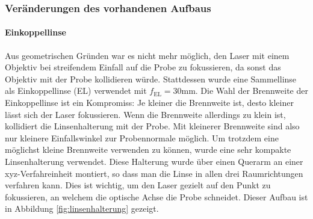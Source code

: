 \documentclass[titlepage,  ngerman]{article}
\begin{document}
	\subsubsection{Veränderungen des vorhandenen Aufbaus}
	\label{sec:OpticalChanges}
	\paragraph{Einkoppellinse}
	Aus geometrischen Gründen war es nicht mehr möglich, den Laser mit einem Objektiv bei streifendem Einfall auf die Probe zu fokussieren, da sonst das Objektiv mit der Probe kollidieren würde. Stattdessen wurde eine Sammellinse als Einkoppellinse (EL) verwendet mit $f_{\mathrm{EL}}= 30\mathrm{mm}$. Die Wahl der Brennweite der Einkoppellinse ist ein Kompromiss: Je kleiner die Brennweite ist, desto kleiner lässt sich der Laser fokussieren. Wenn die Brennweite allerdings zu klein ist, kollidiert die Linsenhalterung mit der Probe. Mit kleinerer Brennweite sind also nur kleinere Einfallswinkel zur Probennormale möglich. Um trotzdem eine möglichst kleine Brennweite verwenden zu können, wurde eine sehr kompakte Linsenhalterung verwendet. Diese Halterung wurde über einen Querarm an einer xyz-Verfahreinheit montiert, so dass man die Linse in allen drei Raumrichtungen verfahren kann. Dies ist wichtig, um den Laser gezielt auf den Punkt zu fokussieren, an welchem die optische Achse die Probe schneidet. Dieser Aufbau ist in Abbildung \ref{fig:linsenhalterung} gezeigt.
\end{document}
